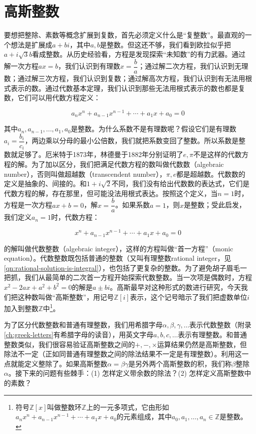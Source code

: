 \documentclass[b5paper]{ctexart}
\begin{document}
\section{高斯整数}

要想把整除、素数等概念扩展到复数，首先必须定义什么是“复整数”。最直观的一个想法是扩展成$a + bi$，其中$a, b$是整数。但这还不够，我们看到欧拉似乎把$a + i\sqrt{3}b$看成整数。从历史经验看，方程是发现探索“未知数”的有力武器。通过解一次方程$ax = b$，我们认识到有理数$x = \dfrac{b}{a}$；通过解二次方程，我们认识到无理数；通过解三次方程，我们认识到复数；通过解高次方程，我们认识到有无法用根式表示的数。通过代数基本定理，我们认识到那些无法用根式表示的数也都是复数，它们可以用代数方程定义：

\[
a_n x^n + a_{n-1} x^{n-1} + \dotsb + a_1 x + a_0 = 0
\]

其中$a_n, a_{n-1}, ..., a_1, a_0$是整数。为什么系数不是有理数呢？假设它们是有理数$a_i = \dfrac{b_i}{c_i}$，两边乘以分母的最小公倍数，我们就把系数变回了整数。所以系数是整数就足够了。厄米特于1873年，林德曼于1882年分别证明了$e, \pi$不是这样的代数方程的解。为了加以区分，我们把满足代数方程的数叫做代数数（algebraic number），否则叫做超越数（transcendent number），$\pi, e$都是超越数。代数数的定义是抽象的、间接的。和$1 + i\sqrt{2}$不同，我们没有给出代数数的表达式，它们是代数方程的解，存在那里，但可能没法用根式表达。按照这个定义，当$n = 1$时，方程是一次方程$ax + b = 0$，解$x = \dfrac{b}{a}$。如果系数$a = 1$，则$x$是整数；受此启发，我们定义$a_n = 1$时，代数方程：

\[
x^n + a_{n-1} x^{n-1} + \dotsb + a_1 x + a_0 = 0
\]

  
的解叫做代数整数（algebraic integer），这样的方程叫做“首一方程”（monic equation）。代数整数既包括普通的整数（又叫有理整数rational integer，见\cref{qn:rational-solution-is-integral}），也包括了更复杂的整数。为了避免胡子眉毛一把抓，我们从最简单的二次首一方程开始探索代数整数。当一次项是偶数时，方程$x^2 - 2ax + a^2 + b^2 = 0$的解是$a \pm bi$。高斯最早对这种形式的数进行研究，今天我们把这种数叫做“高斯整数”，用记号$\mathbb{Z}[i]$表示，这个记号暗示了我们把虚数单位$i$加入到整数$\mathbb{Z}$中\footnote{符号$\mathbb{Z}[x]$叫做整数环$\mathbb{Z}$上的一元多项式，它由形如$a_n x^n + a_{n-1} x^{n-1} + \dotsb + a_1 x + a_0$的元素组成，其中$a_0, a_1, \dotsc, a_n \in \mathbb{Z}$是整数。}。

为了区分代数整数和普通有理整数，我们用希腊字母$\alpha, \beta, \gamma, \dotsc$表示代数整数（附录\ref{ch:greek-letters}有希腊字母的读音），用英文字母$a, b, c, \dotsc$表示有理整数。和普通整数类似，我们很容易验证高斯整数之间的$+, -, \times$运算结果仍然是高斯整数，但除法不一定（正如同普通有理整数之间的除法结果不一定是有理整数）。利用这一点就能定义整除了。如果高斯整数$\alpha = \beta\gamma$是另外两个高斯整数的积，我们称$\beta$整除$\alpha$。接下来的问题有些棘手：(1) 怎样定义带余数的除法？(2) 怎样定义高斯整数中的素数？
\end{document}
